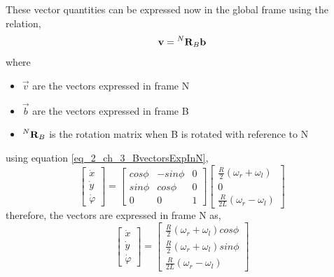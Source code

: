 These vector quantities can be expressed now in the global frame using the relation,
\begin{equation}\label{eq_2_ch_3_BvectorsExpInN}
	\vec{v} = \prescript{N}{}{\vec{R}_{B}} \vec{b}
\end{equation}
where
\begin{itemize}
	\item $\vec{v}$ are the vectors expressed in frame N
	\item $\vec{b}$ are the vectors expressed in frame B
	\item $\prescript{N}{}{\vec{R}_{B}}$ is the rotation matrix when B is rotated with reference to N
\end{itemize}
using equation \ref{eq_2_ch_3_BvectorsExpInN},
\begin{equation}
	\begin{bmatrix} \dot{x} \\ \dot{y} \\ \dot{\varphi} \end{bmatrix} = \begin{bmatrix}
		cos\phi & -sin\phi & 0 \\ sin\phi & cos\phi & 0 \\ 0 & 0 & 1
	\end{bmatrix} \begin{bmatrix}
		\frac{R}{2} \left(\omega_{r} + \omega_{l}\right) \\ 0 \\ \frac{R}{2L} \left(\omega_{r} - \omega_{l}\right)
	\end{bmatrix}
\end{equation}
therefore, the vectors are expressed in frame N as,
\begin{equation} \label{Eq_2_ch_3_difffDriveRobotEuqations}
		\begin{bmatrix} \dot{x} \\ \dot{y} \\ \dot{\varphi} \end{bmatrix} = \begin{bmatrix}
		\frac{R}{2} \left(\omega_{r} + \omega_{l}\right) cos\phi \\ \frac{R}{2} \left(\omega_{r} + \omega_{l}\right) sin\phi \\ \frac{R}{2L} \left(\omega_{r} - \omega_{l}\right)
		\end{bmatrix}
\end{equation}
